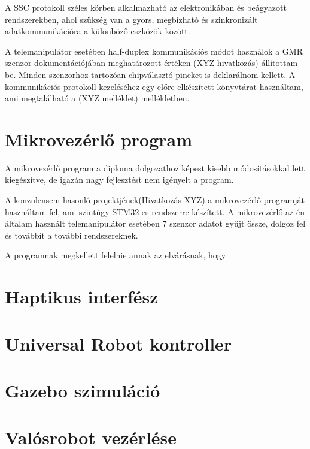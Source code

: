A SSC protokoll széles körben alkalmazható az elektronikában és beágyazott rendszerekben, ahol szükség van a gyors, megbízható és szinkronizált adatkommunikációra a különböző eszközök között.

A telemanipulátor esetében half-duplex kommunikációs módot használok a GMR szenzor dokumentációjában meghatározott értéken (XYZ hivatkozás) állítottam be. Minden szenzorhoz tartozóan chipválasztó pineket is deklarálnom kellett. A kommunikációs protokoll kezeléséhez egy előre elkészített könyvtárat használtam, ami megtalálható a (XYZ melléklet) mellékletben.


\section{Mikrovezérlő program}

A mikrovezérlő program a diploma dolgozathoz képest kisebb módosításokkal lett kiegészítve, de igazán nagy fejlesztést nem igényelt a program.

A konzulensem hasonló projektjének(Hivatkozás XYZ) a mikrovezérlő programját használtam fel, ami szintúgy STM32-es rendszerre készített. A mikrovezérlő az én általam használt telemanipulátor esetében 7 szenzor adatot gyűjt össze, dolgoz fel és továbbít a további rendszereknek.

A programnak megkellett felelnie annak az elvárásnak, hogy 

\section{Haptikus interfész}
\section{Universal Robot kontroller}
\section{Gazebo szimuláció}
\section{Valósrobot vezérlése}
